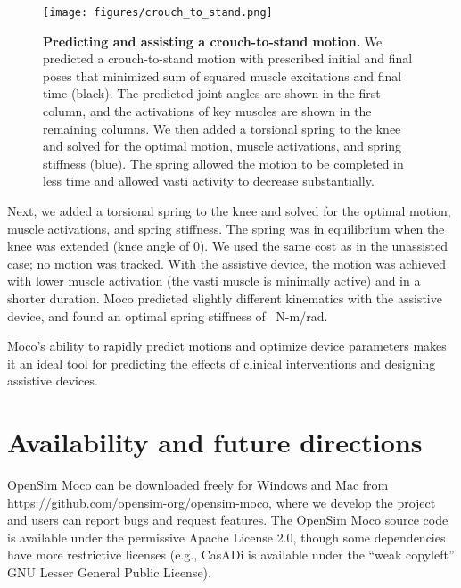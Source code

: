 \documentclass[10pt,letterpaper]{article}
\begin{document}
\begin{figure}[!h]
    \begin{adjustwidth}{-2.25in}{0in} %
        \centering
        \texttt{[image: figures/crouch\_to\_stand.png]}
        \caption{{\bf Predicting and assisting a crouch-to-stand motion.}
We predicted a crouch-to-stand motion with prescribed initial and final poses that minimized sum of squared muscle excitations and final time (black). The predicted joint angles are shown in the first column, and the activations of key muscles are shown in the remaining columns. We then added a torsional spring to the knee and solved for the optimal motion, muscle activations, and spring stiffness (blue). The spring allowed the motion to be completed in less time and allowed vasti activity to decrease substantially.}
        \label{crouchtostand}
    \end{adjustwidth}
\end{figure}

Next, we added a torsional spring to the knee and solved for the optimal motion, muscle activations, and spring stiffness. The spring was in equilibrium when the knee was extended (knee angle of 0). We used the same cost as in the unassisted case; no motion was tracked. With the assistive device, the motion was achieved with lower muscle activation (the vasti muscle is minimally active) and in a shorter duration. Moco predicted slightly different kinematics with the assistive device, and found an optimal spring stiffness of \unskip~N-m/rad.

Moco’s ability to rapidly predict motions and optimize device parameters makes it an ideal tool for predicting the effects of clinical interventions and designing assistive devices.


\section*{Availability and future directions}

OpenSim Moco can be downloaded freely for Windows and Mac from https://github.com/opensim-org/opensim-moco, where we develop the project and users can report bugs and request features. The OpenSim Moco source code is available under the permissive Apache License 2.0, though some dependencies have more restrictive licenses (e.g., CasADi is available under the “weak copyleft” GNU Lesser General Public License).
\end{document}
